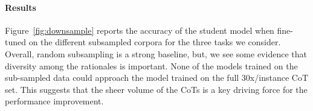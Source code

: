 \documentclass[11pt]{article}
\newcommand\jack[1]{{\color{orange}[#1]$_{Jack}$}}
\begin{document}
\paragraph{Results} Figure~\ref{fig:downsample} reports the accuracy of the student model when fine-tuned on the different subsampled corpora for the three tasks we consider. 
Overall, random subsampling is a strong baseline, but, we see some evidence that diversity among the rationales is important. None of the models trained on the sub-sampled data could approach the model trained on the full 30x/instance CoT set. This suggests that the sheer volume of the CoTs is a key driving force for the performance improvement.




 



\end{document}

